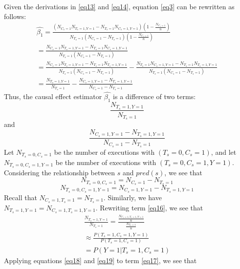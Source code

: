 Given the derivations in \eqref{eq13} and \eqref{eq14}, equation \eqref{eq3} can be rewritten as follows:
\begin{equation}\label{eq15}
\begin{array}{l}
\widehat {\beta _1}=\frac{(N_{C_s=1}N_{T_s=1,Y=1}-N_{T_s=1}N_{C_s=1,Y=1})(1-\frac{N_{C_s=1}}{n})}{N_{T_s=1}(N_{C_s=1}-N_{T_s=1})(1-\frac{N_{C_s=1}}{n})}\\
=\frac{N_{C_s=1}N_{T_s=1,Y=1}-N_{T_s=1}N_{C_s=1,Y=1}}{N_{T_s=1}(N_{C_s=1}-N_{T_s=1})}\\
=\frac{N_{C_s=1}N_{T_s=1,Y=1}-N_{T_s=1}N_{T_s=1,Y=1}}{N_{T_s=1}(N_{C_s=1}-N_{T_s=1})}
-\frac{N_{T_s=1}N_{C_s=1,Y=1}-N_{T_s=1}N_{T_s=1,Y=1}}{N_{T_s=1}(N_{C_s=1}-N_{T_s=1})}\\
=\frac{N_{T_s=1,Y=1}}{N_{T_s=1}}-\frac{N_{C_s=1,Y=1}-N_{T_s=1,Y=1}}{N_{C_s=1}-N_{T_s=1}}
\end{array}
\end{equation}
Thus, the causal effect estimator $\widehat{\beta_1}$ is a difference of two terms:
\begin{equation}\label{eq16}
\frac{N_{T_s=1,Y=1}}{N_{T_s=1}}
\end{equation}
and
\begin{equation}\label{eq17}
\frac{N_{C_s=1,Y=1}-N_{T_s=1,Y=1}}{N_{C_s=1}-N_{T_s=1}}
\end{equation}
Let $N_{T_s=0,C_s=1}$ be the number of executions with $(T_s=0,C_s=1)$, and let $N_{T_s=0,C_s=1,Y=1}$ be the number of executions with $(T_s=0,C_s=1,Y=1)$.  Considering the relationship between $s$ and $pred(s)$, we see that
\begin{equation}\label{eq18}
N_{T_s=0,C_s=1}=N_{C_s=1}-N_{T_s=1}
\end{equation}
\begin{equation}\label{eq19}
N_{T_s=0,C_s=1,Y=1}=N_{C_s=1,Y=1}-N_{T_s=1,Y=1}
\end{equation}
Recall that $N_{C_s=1,T_s=1}=N_{T_s=1}$. Similarly, we have $N_{T_s=1,Y=1}=N_{C_s=1,T_s=1,Y=1}$.  Rewriting term \eqref{eq16}, we see that
\begin{equation}\label{eq20}
\begin{array}{l}
\frac{N_{T_s=1,Y=1}}{N_{T_s=1}}=\frac{\frac{N_{C_s=1,T_s=1,Y=1}}{n}}{\frac{N_{T_s=1}}{n}}\\
\approx \frac{P(T_s=1,C_s=1,Y=1)}{P(T_s=1,C_s=1)}\\
=P(Y=1|T_s=1,C_s=1)
\end{array}
\end{equation}
Applying equations \eqref{eq18} and \eqref{eq19} to term \eqref{eq17}, we see that
